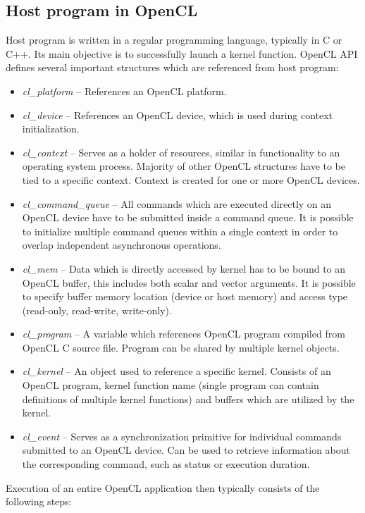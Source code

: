 \documentclass
[
    digital, %
    oneside, %
    table, %
    nolof, %
    nolot, %
    nocover %
]{fithesis3}
\begin{document}
\subsection{Host program in OpenCL}
Host program is written in a regular programming language, typically in C or C++. Its main objective is to successfully launch a kernel function.
OpenCL API defines several important structures which are referenced from host program:
\begin{itemize}
    \item \textit{cl\_platform} -- References an OpenCL platform.
    \item \textit{cl\_device} -- References an OpenCL device, which is used during context initialization.
    \item \textit{cl\_context} -- Serves as a holder of resources, similar in functionality to an operating system process. Majority of other OpenCL
    structures have to be tied to a specific context. Context is created for one or more OpenCL devices.
    \item \textit{cl\_command\_queue} -- All commands which are executed directly on an OpenCL device have to be submitted inside a command queue. It
    is possible to initialize multiple command queues within a single context in order to overlap independent asynchronous operations.
    \item \textit{cl\_mem} -- Data which is directly accessed by kernel has to be bound to an OpenCL buffer, this includes both scalar and vector
    arguments. It is possible to specify buffer memory location (device or host memory) and access type (read-only, read-write, write-only).
    \item \textit{cl\_program} -- A variable which references OpenCL program compiled from OpenCL C source file. Program can be shared by multiple
    kernel objects.
    \item \textit{cl\_kernel} -- An object used to reference a specific kernel. Consists of an OpenCL program, kernel function name (single program
    can contain definitions of multiple kernel functions) and buffers which are utilized by the kernel.
    \item \textit{cl\_event} -- Serves as a synchronization primitive for individual commands submitted to an OpenCL device. Can be used to retrieve
    information about the corresponding command, such as status or execution duration.
\end{itemize}
Execution of an entire OpenCL application then typically consists of the following steps:
\end{document}
